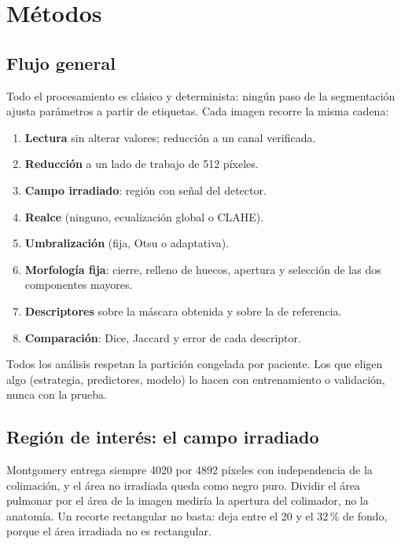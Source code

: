 ﻿\section{Métodos}
\label{sec:metodos}

\subsection{Flujo general}

Todo el procesamiento es clásico y determinista: ningún paso de la segmentación
ajusta parámetros a partir de etiquetas. Cada imagen recorre la misma cadena:

\begin{enumerate}
    \item \textbf{Lectura} sin alterar valores; reducción a un canal verificada.
    \item \textbf{Reducción} a un lado de trabajo de 512 píxeles.
    \item \textbf{Campo irradiado}: región con señal del detector.
    \item \textbf{Realce} (ninguno, ecualización global o CLAHE).
    \item \textbf{Umbralización} (fija, Otsu o adaptativa).
    \item \textbf{Morfología fija}: cierre, relleno de huecos, apertura y selección
    de las dos componentes mayores.
    \item \textbf{Descriptores} sobre la máscara obtenida y sobre la de referencia.
    \item \textbf{Comparación}: Dice, Jaccard y error de cada descriptor.
\end{enumerate}

Todos los análisis respetan la partición congelada por paciente. Los que
eligen algo (estrategia, predictores, modelo) lo hacen con entrenamiento o
validación, nunca con la prueba.

\subsection{Región de interés: el campo irradiado}

Montgomery entrega siempre 4020 por 4892 píxeles con independencia de la
colimación, y el área no irradiada queda como negro puro. Dividir el área pulmonar
por el área de la imagen mediría la apertura del colimador, no la anatomía. Un
recorte rectangular no basta: deja entre el 20 y el 32\,\% de fondo, porque el
área irradiada no es rectangular.

